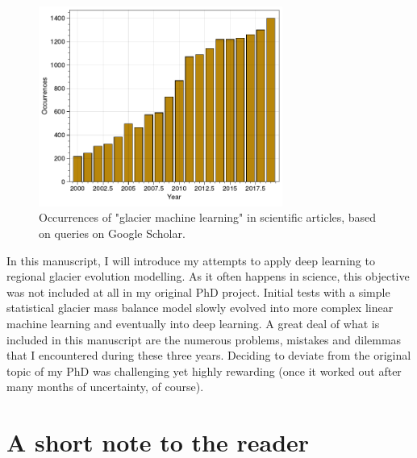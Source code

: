 \begin{figure}[h]
\centering
\includegraphics[width=8cm]{Figures/intro/Figure_3.pdf}
\caption{Occurrences of "glacier machine learning" in scientific articles, based on queries on Google Scholar.} 
\label{intro:fig1}
\end{figure} 

In this manuscript, I will introduce my attempts to apply deep learning to regional glacier evolution modelling. As it often happens in science, this objective was not included at all in my original PhD project. Initial tests with a simple statistical glacier mass balance model slowly evolved into more complex linear machine learning and eventually into deep learning. A great deal of what is included in this manuscript are the numerous problems, mistakes and dilemmas that I encountered during these three years. Deciding to deviate from the original topic of my PhD was challenging yet highly rewarding (once it worked out after many months of uncertainty, of course).

\section{A short note to the reader}
\Blindtext